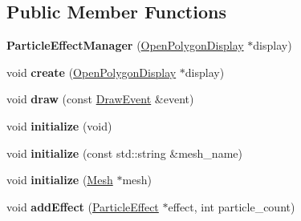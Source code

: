 \subsection*{Public Member Functions}
\begin{DoxyCompactItemize}
\item 
\hypertarget{classEngine_1_1ParticleEffectManager_a86f690f39fcef9dabfec281bffb80e14}{}{\bfseries Particle\+Effect\+Manager} (\hyperlink{classEngine_1_1OpenPolygonDisplay}{Open\+Polygon\+Display} $\ast$display)\label{classEngine_1_1ParticleEffectManager_a86f690f39fcef9dabfec281bffb80e14}

\item 
\hypertarget{classEngine_1_1ParticleEffectManager_ae016d027787d8fac9db8dd59ccc94e27}{}void {\bfseries create} (\hyperlink{classEngine_1_1OpenPolygonDisplay}{Open\+Polygon\+Display} $\ast$display)\label{classEngine_1_1ParticleEffectManager_ae016d027787d8fac9db8dd59ccc94e27}

\item 
\hypertarget{classEngine_1_1ParticleEffectManager_a2afa33d7418ddb473429bd17fbfc6938}{}void {\bfseries draw} (const \hyperlink{classEngine_1_1DrawEvent}{Draw\+Event} \&event)\label{classEngine_1_1ParticleEffectManager_a2afa33d7418ddb473429bd17fbfc6938}

\item 
\hypertarget{classEngine_1_1ParticleEffectManager_a6c801aa851b3b8356af24664f7fef447}{}void {\bfseries initialize} (void)\label{classEngine_1_1ParticleEffectManager_a6c801aa851b3b8356af24664f7fef447}

\item 
\hypertarget{classEngine_1_1ParticleEffectManager_ad877db180062f34aac1460eebcd7ca78}{}void {\bfseries initialize} (const std\+::string \&mesh\+\_\+name)\label{classEngine_1_1ParticleEffectManager_ad877db180062f34aac1460eebcd7ca78}

\item 
\hypertarget{classEngine_1_1ParticleEffectManager_ada3f0a45f95007e41ce2cced7eba1eab}{}void {\bfseries initialize} (\hyperlink{classEngine_1_1Mesh}{Mesh} $\ast$mesh)\label{classEngine_1_1ParticleEffectManager_ada3f0a45f95007e41ce2cced7eba1eab}

\item 
\hypertarget{classEngine_1_1ParticleEffectManager_a3779524ad57f1c962b91c6f195b7b5cf}{}void {\bfseries add\+Effect} (\hyperlink{classEngine_1_1ParticleEffect}{Particle\+Effect} $\ast$effect, int particle\+\_\+count)\label{classEngine_1_1ParticleEffectManager_a3779524ad57f1c962b91c6f195b7b5cf}


\end{DoxyCompactItemize}

